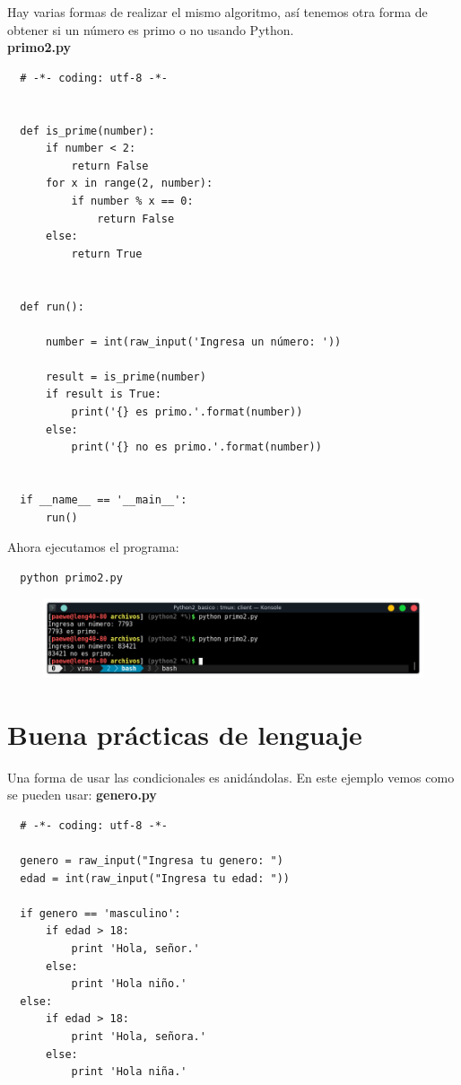 \documentclass{article}
\begin{document}
Hay varias formas de realizar el mismo algoritmo, así tenemos otra forma de
obtener si un número es primo o no usando Python.\\

\textbf{primo2.py}
\begin{verbatim}
  # -*- coding: utf-8 -*-


  def is_prime(number):
      if number < 2:
          return False
      for x in range(2, number):
          if number % x == 0:
              return False
      else:
          return True


  def run():

      number = int(raw_input('Ingresa un número: '))

      result = is_prime(number)
      if result is True:
          print('{} es primo.'.format(number))
      else:
          print('{} no es primo.'.format(number))


  if __name__ == '__main__':
      run()
\end{verbatim}

Ahora ejecutamos el programa:

\begin{verbatim}
  python primo2.py
\end{verbatim}

\begin{figure}[h!]
  \centering
  \includegraphics[scale=0.75]{./Pictures/027_primo2.png}
\end{figure}

\newpage

\section{Buena prácticas de lenguaje}%
Una forma de usar las condicionales es anidándolas. En este ejemplo vemos como
se pueden usar:
\textbf{genero.py}
\begin{verbatim}
  # -*- coding: utf-8 -*-

  genero = raw_input("Ingresa tu genero: ")
  edad = int(raw_input("Ingresa tu edad: "))

  if genero == 'masculino':
      if edad > 18:
          print 'Hola, señor.'
      else:
          print 'Hola niño.'
  else:
      if edad > 18:
          print 'Hola, señora.'
      else:
          print 'Hola niña.'
\end{verbatim}
\end{document}
